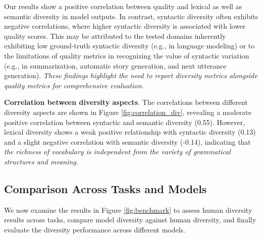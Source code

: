 \documentclass[11pt,a4paper]{article}
\begin{document}
Our results show a positive correlation between quality and lexical as well as semantic diversity in model outputs.	 %
In contrast, syntactic diversity often exhibits negative correlations, where higher syntactic diversity is associated with lower quality scores.
This may be attributed to the tested domains inherently exhibiting low ground-truth syntactic diversity (e.g., in language modeling) or to the limitations of quality metrics in recognizing the value of syntactic variation (e.g., in summarization, automatic story generation, and next utterance generation).
\textit{These findings highlight the need to report diversity metrics alongside quality metrics for comprehensive evaluation.}

\smallskip
\noindent\textbf{Correlation between diversity aspects}.\label{sec:correlation}
The correlations between different diversity aspects are shown in Figure \ref{fig:correlation_div}, revealing a moderate positive correlation between syntactic and semantic diversity (0.55).
However, lexical diversity shows a weak positive relationship with syntactic diversity (0.13) and a slight negative correlation with semantic diversity (-0.14), indicating that \textit{the richness of vocabulary is independent from the variety of grammatical structures and meaning}.









\subsection{Comparison Across Tasks and Models} \label{sec:ComparisonTasksModels}

We now examine the results in Figure \ref{fig:benchmark} to assess human diversity results across tasks, compare model diversity against human diversity, and finally evaluate the diversity performance across different models.
\end{document}
